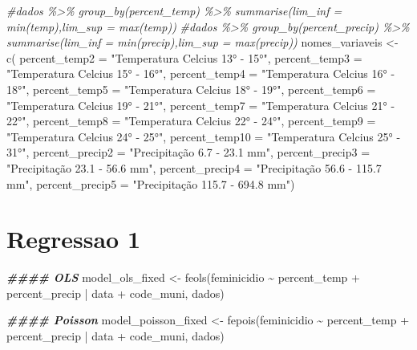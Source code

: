 \documentclass[
]{article}
\newenvironment{Shaded}{\begin{snugshade}}{\end{snugshade}}
\newcommand{\AttributeTok}[1]{\textcolor[rgb]{0.77,0.63,0.00}{#1}}
\newcommand{\CommentTok}[1]{\textcolor[rgb]{0.56,0.35,0.01}{\textit{#1}}}
\newcommand{\DocumentationTok}[1]{\textcolor[rgb]{0.56,0.35,0.01}{\textbf{\textit{#1}}}}
\newcommand{\FunctionTok}[1]{\textcolor[rgb]{0.00,0.00,0.00}{#1}}
\newcommand{\NormalTok}[1]{#1}
\newcommand{\OtherTok}[1]{\textcolor[rgb]{0.56,0.35,0.01}{#1}}
\newcommand{\SpecialCharTok}[1]{\textcolor[rgb]{0.00,0.00,0.00}{#1}}
\newcommand{\StringTok}[1]{\textcolor[rgb]{0.31,0.60,0.02}{#1}}
\begin{document}
\begin{Shaded}
\begin{Highlighting}[]
\CommentTok{\#dados \%\textgreater{}\% group\_by(percent\_temp) \%\textgreater{}\% summarise(lim\_inf = min(temp),lim\_sup = max(temp))}
\CommentTok{\#dados \%\textgreater{}\% group\_by(percent\_precip) \%\textgreater{}\% summarise(lim\_inf = min(precip),lim\_sup = max(precip))}
\NormalTok{nomes\_variaveis }\OtherTok{\textless{}{-}} \FunctionTok{c}\NormalTok{(}
  \AttributeTok{percent\_temp2 =} \StringTok{"Temperatura Celcius 13° {-} 15°"}\NormalTok{,}
  \AttributeTok{percent\_temp3 =} \StringTok{"Temperatura Celcius 15° {-} 16°"}\NormalTok{,}
  \AttributeTok{percent\_temp4 =} \StringTok{"Temperatura Celcius 16° {-} 18°"}\NormalTok{,}
  \AttributeTok{percent\_temp5 =} \StringTok{"Temperatura Celcius 18° {-} 19°"}\NormalTok{,}
  \AttributeTok{percent\_temp6 =} \StringTok{"Temperatura Celcius 19° {-} 21°"}\NormalTok{,}
  \AttributeTok{percent\_temp7 =} \StringTok{"Temperatura Celcius 21° {-} 22°"}\NormalTok{,}
  \AttributeTok{percent\_temp8 =} \StringTok{"Temperatura Celcius 22° {-} 24°"}\NormalTok{,}
  \AttributeTok{percent\_temp9 =} \StringTok{"Temperatura Celcius 24° {-} 25°"}\NormalTok{,}
  \AttributeTok{percent\_temp10 =} \StringTok{"Temperatura Celcius 25° {-} 31°"}\NormalTok{,}
  \AttributeTok{percent\_precip2 =} \StringTok{"Precipitação 6.7 {-} 23.1 mm"}\NormalTok{,}
  \AttributeTok{percent\_precip3 =} \StringTok{"Precipitação 23.1 {-} 56.6 mm"}\NormalTok{,}
  \AttributeTok{percent\_precip4 =} \StringTok{"Precipitação 56.6 {-} 115.7 mm"}\NormalTok{,}
  \AttributeTok{percent\_precip5 =} \StringTok{"Precipitação 115.7 {-} 694.8 mm"}\NormalTok{)}
\end{Highlighting}
\end{Shaded}

\hypertarget{regressao-1}{%
\section{Regressao 1}\label{regressao-1}}

\begin{Shaded}
\begin{Highlighting}[]
\DocumentationTok{\#\#\#\# OLS}
\NormalTok{model\_ols\_fixed }\OtherTok{\textless{}{-}} \FunctionTok{feols}\NormalTok{(feminicidio  }\SpecialCharTok{\textasciitilde{}}\NormalTok{ percent\_temp }\SpecialCharTok{+}\NormalTok{ percent\_precip }\SpecialCharTok{|}\NormalTok{ data }\SpecialCharTok{+}\NormalTok{ code\_muni, dados)}

\DocumentationTok{\#\#\#\# Poisson}
\NormalTok{model\_poisson\_fixed }\OtherTok{\textless{}{-}} \FunctionTok{fepois}\NormalTok{(feminicidio  }\SpecialCharTok{\textasciitilde{}}\NormalTok{ percent\_temp }\SpecialCharTok{+}\NormalTok{ percent\_precip }\SpecialCharTok{|}\NormalTok{ data }\SpecialCharTok{+}\NormalTok{ code\_muni, dados)}
\end{Highlighting}
\end{Shaded}
\end{document}
